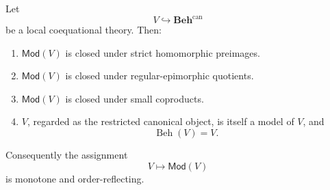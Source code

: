 \begin{theorem}
\label{thm:local-coequational-closure}
    Let
    \[
        V\hookrightarrow\mathbf{Beh}^{\mathrm{can}}
    \]
    be a local coequational theory. Then:
    \begin{enumerate}
        \item \(\mathsf{Mod}(V)\) is closed under strict homomorphic preimages.
        \item \(\mathsf{Mod}(V)\) is closed under regular-epimorphic quotients.
        \item \(\mathsf{Mod}(V)\) is closed under small coproducts.
        \item \(V\), regarded as the restricted canonical object, is itself a
        model of \(V\), and
        \[
            \operatorname{Beh}(V)=V.
        \]
    \end{enumerate}
    Consequently the assignment
    \[
        V\longmapsto\mathsf{Mod}(V)
    \]
    is monotone and order-reflecting.
\end{theorem}

